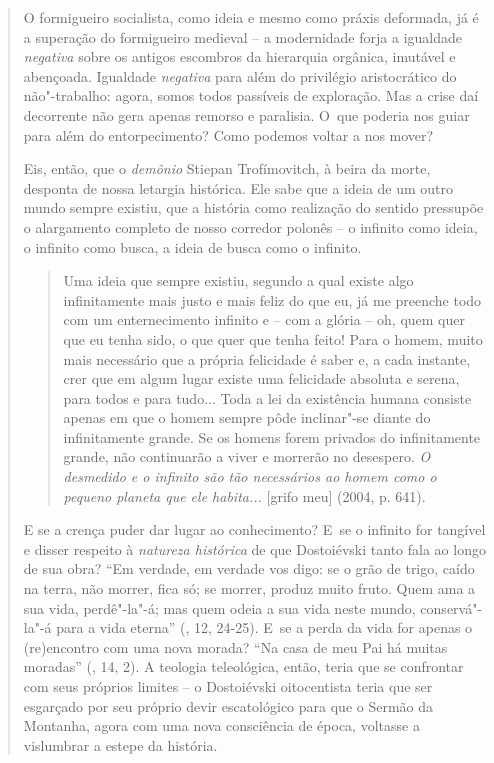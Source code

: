 {\begin{quote}
O formigueiro socialista, como ideia e mesmo como práxis deformada, já é
a superação do formigueiro medieval -- a modernidade forja a igualdade
\emph{negativa} sobre os antigos escombros da hierarquia orgânica,
imutável e abençoada. Igualdade \emph{negativa} para além do privilégio
aristocrático do não"-trabalho: agora, somos todos passíveis de
exploração. Mas a crise daí decorrente não gera apenas remorso e
paralisia. O~que poderia nos guiar para além do entorpecimento? Como
podemos voltar a nos mover?

Eis, então, que o \emph{demônio} Stiepan Trofímovitch, à beira da morte,
desponta de nossa letargia histórica. Ele sabe que a ideia de um outro
mundo sempre existiu, que a história como realização do sentido
pressupõe o alargamento completo de nosso corredor polonês -- o infinito
como ideia, o infinito como busca, a ideia de busca como o infinito.

\begin{quote}
Uma ideia que sempre existiu, segundo a qual existe algo infinitamente
mais justo e mais feliz do que eu, já me preenche todo com um
enternecimento infinito e -- com a glória -- oh, quem quer que eu tenha
sido, o que quer que tenha feito! Para o homem, muito mais necessário
que a própria felicidade é saber e, a cada instante, crer que em algum
lugar existe uma felicidade absoluta e serena, para todos e para tudo...
Toda a lei da existência humana consiste apenas em que o homem sempre
pôde inclinar"-se diante do infinitamente grande. Se os homens forem
privados do infinitamente grande, não continuarão a viver e morrerão no
desespero. \emph{O desmedido e o infinito são tão necessários ao homem
como o pequeno planeta que ele habita...} {[}grifo meu{]} (2004, p.
641).
\end{quote}

E se a crença puder dar lugar ao conhecimento? E~se o infinito for
tangível e disser respeito à \emph{natureza histórica} de que
Dostoiévski tanto fala ao longo de sua obra? ``Em verdade, em verdade
vos digo: se o grão de trigo, caído na terra, não morrer, fica só; se
morrer, produz muito fruto. Quem ama a sua vida, perdê"-la"-á; mas quem
odeia a sua vida neste mundo, conservá"-la"-á para a vida eterna'' (,
12, 24-25). E~se a perda da vida for apenas o (re)encontro com uma nova
morada? ``Na casa de meu Pai há muitas moradas'' (, 14, 2). A
teologia teleológica, então, teria que se confrontar com seus próprios
limites -- o Dostoiévski oitocentista teria que ser esgarçado por seu
próprio devir escatológico para que o Sermão da Montanha, agora com uma
nova consciência de época, voltasse a vislumbrar a estepe da história.


\end{quote}}

